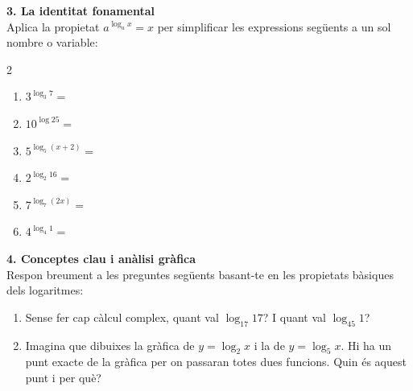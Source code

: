 \documentclass[12pt,a4paper]{article}
\begin{document}
\newpage
\textbf{3. La identitat fonamental} \\
Aplica la propietat $a^{\log_a x} = x$ per simplificar les expressions següents a un sol nombre o variable:\\
\begingroup
\setlength{\fboxsep}{10pt}
\noindent{}
\endgroup
\vspace{0.4cm}
\begin{multicols}{2}
\begin{enumerate}[label=\alph*)]
    \item $3^{\log_3 7} = $
    \item $10^{\log 25} = $
    \item $5^{\log_5 (x+2)} = $
    \item $2^{\log_2 16} = $
    \item $7^{\log_7 (2x)} = $
    \item $4^{\log_4 1} = $
\end{enumerate}
\end{multicols}

\vspace{0.3cm}

\textbf{4. Conceptes clau i anàlisi gràfica} \\
Respon breument a les preguntes següents basant-te en les propietats bàsiques dels logaritmes:
\begin{enumerate}[label=\arabic*.]
    \item Sense fer cap càlcul complex, quant val $\log_{17} 17$? I quant val $\log_{45} 1$?
    \item Imagina que dibuixes la gràfica de $y = \log_2 x$ i la de $y = \log_5 x$. Hi ha un punt exacte de la gràfica per on passaran totes dues funcions. Quin és aquest punt i per què?
\end{enumerate}


\newpage
\end{document}
